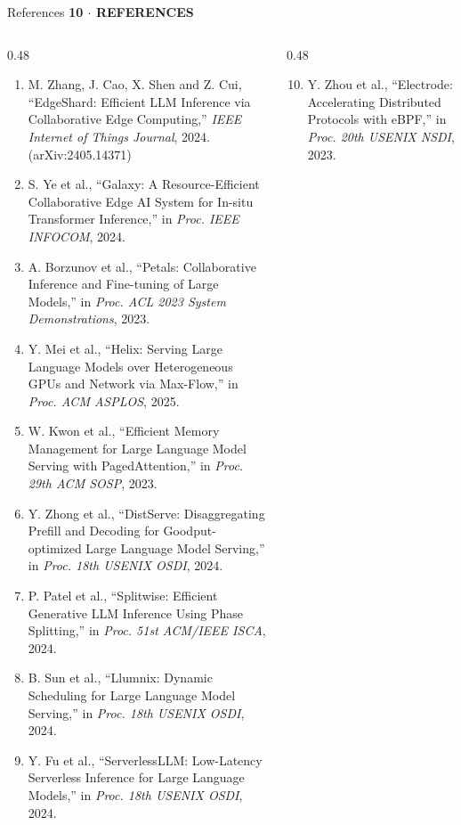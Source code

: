 \documentclass[aspectratio=169,9pt]{beamer}
\newcommand{\kicker}[1]{{\scriptsize\color{keBlue}\bfseries\MakeUppercase{#1}}\par\vspace{0.2em}}
\begin{document}
\begin{frame}[shrink=25]{References}
  \kicker{10 $\cdot$ References}
  \begin{columns}[T]
    \begin{column}{0.48\textwidth}\tiny
\begin{enumerate}\setlength\itemsep{0.42em}
    \item M. Zhang, J. Cao, X. Shen and Z. Cui, ``EdgeShard: Efficient LLM
      Inference via Collaborative Edge Computing,'' \emph{IEEE Internet of
      Things Journal}, 2024. (arXiv:2405.14371)
    \item S. Ye et al., ``Galaxy: A Resource-Efficient Collaborative Edge AI
      System for In-situ Transformer Inference,'' in \emph{Proc. IEEE
      INFOCOM}, 2024.
    \item A. Borzunov et al., ``Petals: Collaborative Inference and Fine-tuning
      of Large Models,'' in \emph{Proc. ACL 2023 System Demonstrations}, 2023.
    \item Y. Mei et al., ``Helix: Serving Large Language Models over
      Heterogeneous GPUs and Network via Max-Flow,'' in \emph{Proc. ACM
      ASPLOS}, 2025.
    \item W. Kwon et al., ``Efficient Memory Management for Large Language
      Model Serving with PagedAttention,'' in \emph{Proc. 29th ACM SOSP}, 2023.
    \item Y. Zhong et al., ``DistServe: Disaggregating Prefill and Decoding for
      Goodput-optimized Large Language Model Serving,'' in \emph{Proc. 18th
      USENIX OSDI}, 2024.
    \item P. Patel et al., ``Splitwise: Efficient Generative LLM Inference
      Using Phase Splitting,'' in \emph{Proc. 51st ACM/IEEE ISCA}, 2024.
    \item B. Sun et al., ``Llumnix: Dynamic Scheduling for Large Language Model
      Serving,'' in \emph{Proc. 18th USENIX OSDI}, 2024.
    \item Y. Fu et al., ``ServerlessLLM: Low-Latency Serverless Inference for
      Large Language Models,'' in \emph{Proc. 18th USENIX OSDI}, 2024.
  \end{enumerate}
    \end{column}
    \begin{column}{0.48\textwidth}\tiny
\begin{enumerate}\setcounter{enumi}{9}\setlength\itemsep{0.42em}
    \item Y. Zhou et al., ``Electrode: Accelerating Distributed Protocols with
      eBPF,'' in \emph{Proc. 20th USENIX NSDI}, 2023.

\end{enumerate}
\end{column}
\end{columns}
\end{frame}
\end{document}

